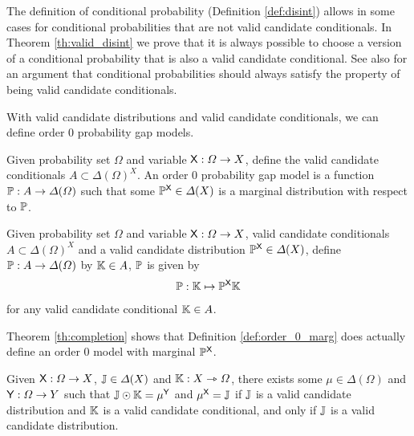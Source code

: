 The definition of conditional probability (Definition \ref{def:disint}) allows in some cases for conditional probabilities that are not valid candidate conditionals. In Theorem \ref{th:valid_disint} we prove that it is always possible to choose a version of a conditional probability that is also a valid candidate conditional. See also \citet{hajek_what_2003} for an argument that conditional probabilities should always satisfy the property of being valid candidate conditionals.

With valid candidate distributions and valid candidate conditionals, we can define order 0 probability gap models.

\begin{definition}
Given probability set $\Omega$ and variable $\mathsf{X}:\Omega \to X$, define the valid candidate conditionals $A\subset \Delta(\Omega)^X$. An order 0 probability gap model is a function $\mathbb{P}:A\to \Delta(\Omega)$ such that some $\mathbb{P}^{\mathsf{X}}\in \Delta(X)$ is a marginal distribution with respect to $\mathbb{P}$.
\end{definition}

\begin{definition}\label{def:order_0_marg}
Given probability set $\Omega$ and variable $\mathsf{X}:\Omega \to X$, valid candidate conditionals $A\subset \Delta(\Omega)^X$ and a valid candidate distribution $\mathbb{P}^{\mathsf{X}}\in \Delta(X)$, define $\mathbb{P}:A\to \Delta(\Omega)$ by $\mathbb{K}\in A$, $\mathbb{P}$ is given by
\begin{align}
	\mathbb{P}: \mathbb{K}\mapsto \mathbb{P}^{\mathsf{X}}\mathbb{K}
\end{align}
for any valid candidate conditional $\mathbb{K}\in A$.
\end{definition}

Theorem \ref{th:completion} shows that Definition \ref{def:order_0_marg} does actually define an order 0 model with marginal $\mathbb{P}^{\mathsf{X}}$.

\begin{theorem}[Completion]\label{th:completion}
Given $\mathsf{X}:\Omega\to X$, $\mathbb{J}\in \Delta(X)$ and $\mathbb{K}:X\rightarrowtriangle \Omega$, there exists some $\mu\in \Delta(\Omega)$ and $\mathsf{Y}:\Omega\to Y$ such that $\mathbb{J}\odot \mathbb{K}=\mu^{\mathsf{Y}}$ and $\mu^{\mathsf{X}}=\mathbb{J}$ if $\mathbb{J}$ is a valid candidate distribution and $\mathbb{K}$ is a valid candidate conditional, and only if $\mathbb{J}$ is a valid candidate distribution.
\end{theorem}

